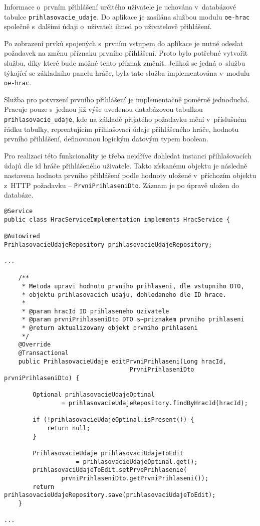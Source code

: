 \documentclass[12pt]{article}
\begin{document}
Informace o~prvním přihlášení určitého uživatele je uchována v~databázové tabulce \texttt{prihlasovacie\_udaje}. Do aplikace je zasílána službou modulu \texttt{oe-hrac} společně s~dalšími údaji o~uživateli ihned po uživatelově přihlášení.

Po zobrazení prvků spojených s~prvním vstupem do aplikace je nutné odeslat požadavek na změnu příznaku prvního přihlášení. Proto bylo potřebné vytvořit službu, díky které bude možné tento příznak změnit. Jelikož se jedná o~službu týkající se základního panelu hráče, byla tato služba implementována v~modulu \texttt{oe-hrac}.

Služba pro potvrzení prvního přihlášení je implementačně poměrně jednoduchá. Pracuje pouze s~jednou již výše uvedenou databázovou tabulkou \texttt{prihlasovacie\_udaje}, kde na základě přijatého požadavku mění v~příslušném řádku tabulky, reprentujícím přihlašovací údaje přihlášeného hráče, hodnotu prvního přihlášení, definovanou logickým datovým typem boolean. 

Pro realizaci této funkcionality je třeba nejdříve dohledat instanci přihlašovacích údajů dle id hráče přihlášeného uživatele. Takto získanému objektu je následně nastavena hodnota prvního přihlášení podle hodnoty uložené v~příchozím objektu z~HTTP požadavku -- \texttt{PrvniPrihlaseniDto}.  Záznam je po úpravě uložen do databáze. 

\clearpage

\begin{lstlisting}
@Service
public class HracServiceImplementation implements HracService {

@Autowired
PrihlasovacieUdajeRepository prihlasovacieUdajeRepository;

...

    /**
     * Metoda upravi hodnotu prvniho prihlaseni, dle vstupniho DTO,
     * objektu prihlasovacich udaju, dohledaneho dle ID hrace.
     * 
     * @param hracId ID prihlaseneho uzivatele
     * @param prvniPrihlaseniDto DTO s~priznakem prvniho prihlaseni
     * @return aktualizovany objekt prvniho prihlaseni
     */
    @Override
    @Transactional
    public PrihlasovacieUdaje editPrvniPrihlaseni(Long hracId,
                                   PrvniPrihlaseniDto prvniPrihlaseniDto) {

        Optional prihlasovacieUdajeOptinal
                = prihlasovacieUdajeRepository.findByHracId(hracId);

        if (!prihlasovacieUdajeOptinal.isPresent()) {
            return null;
        }

        PrihlasovacieUdaje prihlasovaciUdajeToEdit 
                    = prihlasovacieUdajeOptinal.get();
        prihlasovaciUdajeToEdit.setPrvePrihlasenie(
                prvniPrihlaseniDto.getPrvniPrihlaseni());
        return prihlasovacieUdajeRepository.save(prihlasovaciUdajeToEdit);
    }

...
\end{lstlisting}
\end{document}
